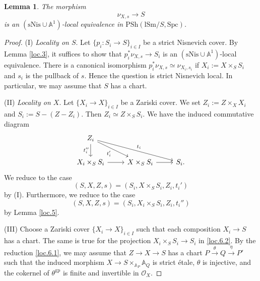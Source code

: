\documentclass[10pt]{amsart}
\newtheorem{lem}[thm]{Lemma}
\theoremstyle{definition}
\theoremstyle{remark}
\numberwithin{equation}{subsection}
\newcommand{\A}{\mathbb{A}}
\newcommand{\cO}{\mathcal{O}}
\newcommand{\lSm}{\mathrm{lSm}}
\newcommand{\infPsh}{\mathrm{PSh}}
\newcommand{\Spc}{\mathrm{Spc}}
\newcommand{\gp}{\mathrm{gp}}
\newcommand{\sNis}{\mathrm{sNis}}
\begin{document}
\begin{lem}
\label{loc.6}
The morphism
\[
\nu_{X,s}\to S
\]
is an $(\sNis\cup \A^1)$-local equivalence in $\infPsh(\lSm/S,\Spc)$.
\end{lem}
\begin{proof}
(I) \emph{Locality on $S$}.
Let $\{p_i\colon S_i\to S\}_{i\in I}$ be a strict Nisnevich cover.
By Lemma \ref{loc.3}, it suffices to show that $p_i^*\nu_{X,s}\to S_i$ is an $(\sNis\cup \A^1)$-local equivalence.
There is a canonical isomorphism $p_i^*\nu_{X,s}\simeq \nu_{X_i,s_i}$ if $X_i:=X\times_S S_i$ and $s_i$ is the pullback of $s$.
Hence the question is strict Nisnevich local.
In particular, we may assume that $S$ has a chart.

(II) \emph{Locality on $X$}.
Let $\{X_i\to X\}_{i\in I}$ be a Zariski cover.
We set $Z_i:=Z\times_X X_i$ and $S_i:=S-(Z-Z_i)$.
Then $Z_i\simeq Z\times_S S_i$.
We have the induced commutative diagram
\begin{equation}
\label{loc.6.2}
\begin{tikzcd}
Z_i\ar[d,"t_i''"']\ar[rd,"t_i'"']\ar[rrd,"t_i"]
\\
X_i\times_S S_i\ar[r]&
X\times_S S_i\ar[r]&
S_i.
\end{tikzcd}
\end{equation}
We reduce to the case
\[
(S,X,Z,s)=(S_i,X\times_S S_i,Z_i,t_i')
\]
by (I).
Furthermore, we reduce to the case
\begin{equation}
\label{loc.6.1}
(S,X,Z,s)=(S_i,X_i\times_S S_i,Z_i,t_i'')
\end{equation}
by Lemma \ref{loc.5}.

(III) Choose a Zariski cover $\{X_i\to X\}_{i\in I}$ such that each composition $X_i\to S$ has a chart.
The same is true for the projection $X_i\times_S S_i\to S_i$ in \eqref{loc.6.2}.
By the reduction \eqref{loc.6.1}, we may assume that $Z\to X\to S$ has a chart $P\xrightarrow{\theta} Q\xrightarrow{\eta} P'$ such that the induced morphism $X\to S\times_{\A_P} \A_Q$ is strict \'etale, $\theta$ is injective, and the cokernel of $\theta^{\gp}$ is finite and invertible in $\cO_X$.


\end{proof}
\end{document}
